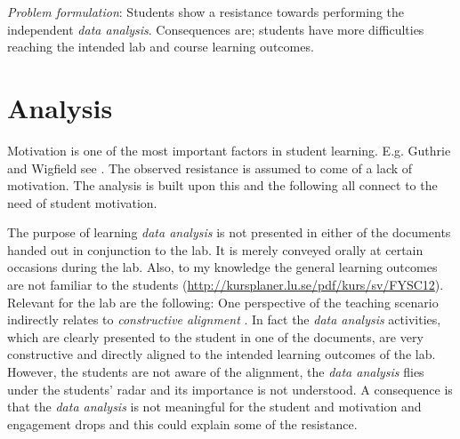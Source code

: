 \documentclass[]{article}
\begin{document}
{\it Problem formulation}: Students show a resistance towards performing the independent {\it data analysis}. Consequences are; students have more difficulties reaching the intended lab and course learning outcomes.


\section*{Analysis}
Motivation is one of the most important factors in student learning. E.g. Guthrie and Wigfield see .
The observed resistance is assumed to come of a lack of motivation.
The analysis is built upon this and the following all connect to the need of student motivation.

The purpose of learning {\it data analysis} is not presented in either of the documents handed out in conjunction to the lab.
It is merely conveyed orally at certain occasions during the lab.
Also, to my knowledge the general learning outcomes are not familiar to the students (\url{http://kursplaner.lu.se/pdf/kurs/sv/FYSC12}).
Relevant for the lab are the following:
One perspective of the teaching scenario indirectly relates to {\it constructive alignment} \cite{biggs}.
In fact the {\it data analysis} activities, which are clearly presented to the student in one of the documents, are very constructive and directly aligned to the intended learning outcomes of the lab.
However, the students are not aware of the alignment, the {\it data analysis} flies under the students' radar and its importance is not understood.
A consequence is that the {\it data analysis} is not meaningful for the student and motivation and engagement drops \cite{illeris} and this could explain some of the resistance.
\end{document}
